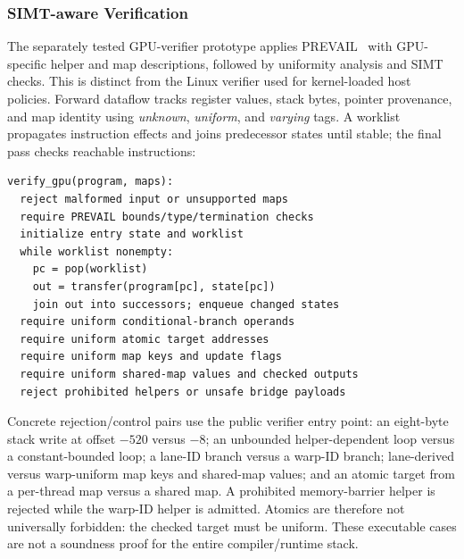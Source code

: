 
\subsubsection{SIMT-aware Verification}

The separately tested GPU-verifier prototype applies PREVAIL~\cite{prevail-verifier} with GPU-specific helper and map descriptions, followed by uniformity analysis and SIMT checks. This is distinct from the Linux verifier used for kernel-loaded host policies. Forward dataflow tracks register values, stack bytes, pointer provenance, and map identity using \emph{unknown}, \emph{uniform}, and \emph{varying} tags. A worklist propagates instruction effects and joins predecessor states until stable; the final pass checks reachable instructions:

\begin{lstlisting}[language={},xleftmargin=0pt,numbers=none]
verify_gpu(program, maps):
  reject malformed input or unsupported maps
  require PREVAIL bounds/type/termination checks
  initialize entry state and worklist
  while worklist nonempty:
    pc = pop(worklist)
    out = transfer(program[pc], state[pc])
    join out into successors; enqueue changed states
  require uniform conditional-branch operands
  require uniform atomic target addresses
  require uniform map keys and update flags
  require uniform shared-map values and checked outputs
  reject prohibited helpers or unsafe bridge payloads
\end{lstlisting}

Concrete rejection/control pairs use the public verifier entry point: an eight-byte stack write at offset $-520$ versus $-8$; an unbounded helper-dependent loop versus a constant-bounded loop; a lane-ID branch versus a warp-ID branch; lane-derived versus warp-uniform map keys and shared-map values; and an atomic target from a per-thread map versus a shared map. A prohibited memory-barrier helper is rejected while the warp-ID helper is admitted. Atomics are therefore not universally forbidden: the checked target must be uniform. These executable cases are not a soundness proof for the entire compiler/runtime stack.


